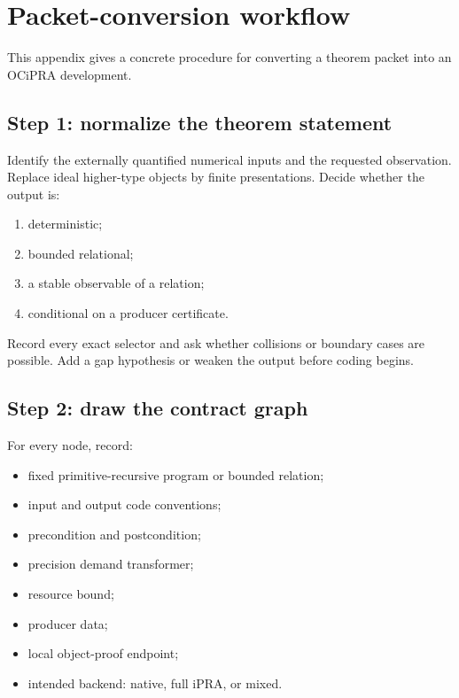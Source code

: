 \appendix
\section{Packet-conversion workflow}

This appendix gives a concrete procedure for converting a theorem packet into an OCiPRA development.

\subsection{Step 1: normalize the theorem statement}

Identify the externally quantified numerical inputs and the requested observation.  Replace ideal higher-type objects by finite presentations.  Decide whether the output is:

\begin{enumerate}
  \item deterministic;
  \item bounded relational;
  \item a stable observable of a relation;
  \item conditional on a producer certificate.
\end{enumerate}

Record every exact selector and ask whether collisions or boundary cases are possible.  Add a gap hypothesis or weaken the output before coding begins.

\subsection{Step 2: draw the contract graph}

For every node, record:

\begin{itemize}
  \item fixed primitive-recursive program or bounded relation;
  \item input and output code conventions;
  \item precondition and postcondition;
  \item precision demand transformer;
  \item resource bound;
  \item producer data;
  \item local object-proof endpoint;
  \item intended backend: native, full iPRA, or mixed.
\end{itemize}

